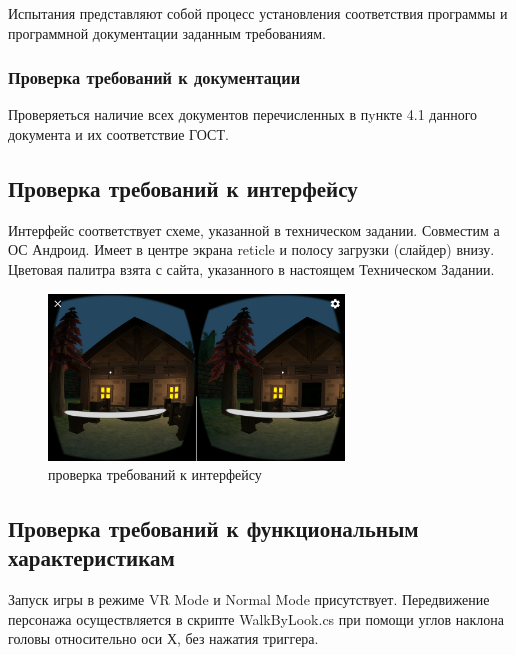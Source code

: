 Испытания представляют собой процесс установления соответствия программы и
программной документации заданным требованиям.

\subsubsection{Проверка требований к документации}
Проверяеться наличие всех документов перечисленных в пyнкте 4.1 данного документа и их соответствие ГОСТ.

\subsection{Проверка требований к интерфейсу}
Интерфейс соответствует схеме, указанной в техническом задании. Совместим а ОС Андроид. Имеет в центре экрана reticle  и полосу загрузки (слайдер) внизу. Цветовая палитра взята с сайта, указанного в настоящем Техническом Задании.

\begin{figure}[h!]
    \centering
    \includegraphics[width=0.7\textwidth]{./screenshots/home.jpg}
    \caption{проверка требований к интерфейсу}
    \label{home}
\end{figure}

\newpage
\subsection{Проверка требований к функциональным характеристикам}

Запуск игры в режиме VR Mode и Normal Mode присутствует. Передвижение персонажа осуществляется в скрипте WalkByLook.cs при помощи углов наклона головы относительно оси Х, без нажатия триггера.

